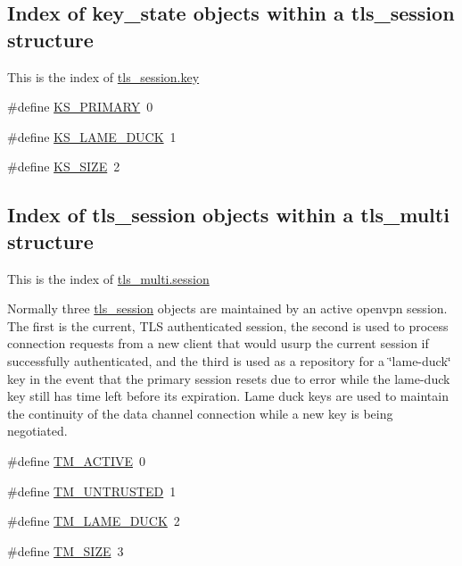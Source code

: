 \subsection*{Index of key\+\_\+state objects within a tls\+\_\+session structure}
\label{_amgrp348dc162a1f22f9ec4d9fab524f330d1}%
This is the index of {\ttfamily \hyperlink{structtls__session_a1de4672c1233dd4887122a909b10c314}{tls\+\_\+session.\+key}} \begin{DoxyCompactItemize}
\item 
\#define \hyperlink{group__control__processor_ga53a47713d8d3afdedf8826560da3e8b1}{K\+S\+\_\+\+P\+R\+I\+M\+A\+R\+Y}~0
\item 
\#define \hyperlink{group__control__processor_gadf097bad90fb34433800b15445db8398}{K\+S\+\_\+\+L\+A\+M\+E\+\_\+\+D\+U\+C\+K}~1
\item 
\#define \hyperlink{group__control__processor_ga136f3095237ae23358c30581753e4178}{K\+S\+\_\+\+S\+I\+Z\+E}~2
\end{DoxyCompactItemize}
\subsection*{Index of tls\+\_\+session objects within a tls\+\_\+multi structure}
\label{_amgrp12b5b9f5a31276d4e8a8352c56f23541}%
This is the index of {\ttfamily \hyperlink{structtls__multi_a74e065e432f819307a830ef38d5be73c}{tls\+\_\+multi.\+session}} 

Normally three \hyperlink{structtls__session}{tls\+\_\+session} objects are maintained by an active openvpn session. The first is the current, T\+L\+S authenticated session, the second is used to process connection requests from a new client that would usurp the current session if successfully authenticated, and the third is used as a repository for a \char`\"{}lame-\/duck\char`\"{} key in the event that the primary session resets due to error while the lame-\/duck key still has time left before its expiration. Lame duck keys are used to maintain the continuity of the data channel connection while a new key is being negotiated. \begin{DoxyCompactItemize}
\item 
\#define \hyperlink{group__control__processor_gad3c70b02a0ca4537fba1d53802e1e429}{T\+M\+\_\+\+A\+C\+T\+I\+V\+E}~0
\item 
\#define \hyperlink{group__control__processor_ga6575a67494af1ca3e9608941e12a5386}{T\+M\+\_\+\+U\+N\+T\+R\+U\+S\+T\+E\+D}~1
\item 
\#define \hyperlink{group__control__processor_ga89d765b434597e7194131ace44c605af}{T\+M\+\_\+\+L\+A\+M\+E\+\_\+\+D\+U\+C\+K}~2
\item 
\#define \hyperlink{group__control__processor_gaa195349d22c113d3acc88b6795e491b8}{T\+M\+\_\+\+S\+I\+Z\+E}~3
\end{DoxyCompactItemize}


